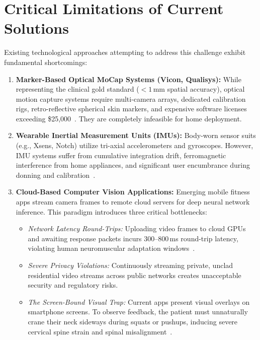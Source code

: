 \documentclass[12pt]{report}
\begin{document}
\section{Critical Limitations of Current Solutions}
Existing technological approaches attempting to address this challenge exhibit fundamental shortcomings:
\begin{enumerate}[label={(\arabic*)}]
    \item \textbf{Marker-Based Optical MoCap Systems (Vicon, Qualisys):} While representing the clinical gold standard ($<1$\,mm spatial accuracy), optical motion capture systems require multi-camera arrays, dedicated calibration rigs, retro-reflective spherical skin markers, and expensive software licenses exceeding \$25,000~\cite{vanderkruk2018methods}. They are completely infeasible for home deployment.
    \item \textbf{Wearable Inertial Measurement Units (IMUs):} Body-worn sensor suits (e.g., Xsens, Notch) utilize tri-axial accelerometers and gyroscopes. However, IMU systems suffer from cumulative integration drift, ferromagnetic interference from home appliances, and significant user encumbrance during donning and calibration~\cite{lewin2017mobile}.
    \newpage
\item \textbf{Cloud-Based Computer Vision Applications:} Emerging mobile fitness apps stream camera frames to remote cloud servers for deep neural network inference. This paradigm introduces three critical bottlenecks:
    \begin{itemize}
        \item \textit{Network Latency Round-Trips:} Uploading video frames to cloud GPUs and awaiting response packets incurs $300\text{--}800$\,ms round-trip latency, violating human neuromuscular adaptation windows~\cite{ravi2016deep}.
        \item \textit{Severe Privacy Violations:} Continuously streaming private, unclad residential video streams across public networks creates unacceptable security and regulatory risks.
        \item \textit{The Screen-Bound Visual Trap:} Current apps present visual overlays on smartphone screens. To observe feedback, the patient must unnaturally crane their neck sideways during squats or pushups, inducing severe cervical spine strain and spinal misalignment~\cite{sigrist2013augmented, wulf2013attentional}.
    \end{itemize}
\end{enumerate}
\end{document}
